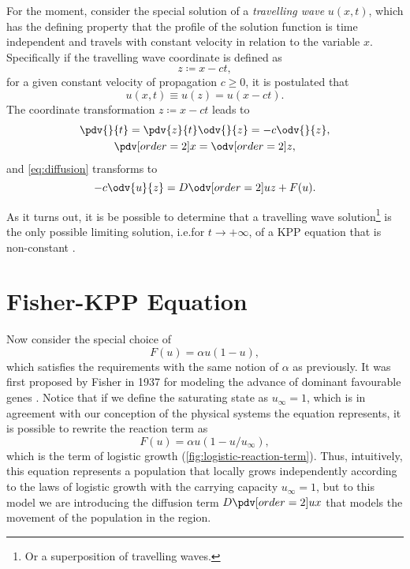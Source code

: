For the moment, consider the special solution of a \emph{travelling wave} \(u(x,t)\), which has the defining property that
    the profile of the solution function is time independent and travels with constant velocity in relation to the 
    variable \(x\).
Specifically if the travelling wave coordinate is defined as \[
    z \coloneqq x - ct,
    \] for a given constant velocity of propagation \(c \ge 0\), it is postulated that \[
        u(x,t) \equiv u(z) = u(x - ct).
    \]
The coordinate transformation \(z \coloneqq x - ct\) leads to \begin{equation}\label{eq:tw-transformation}
    \begin{gathered}
        \pdv{}{t} = \pdv{z}{t} \odv{}{z} = -c \odv{}{z},\\
        \pdv[order={2}]{}{x} = \odv[order={2}]{}{z},
    \end{gathered}
\end{equation}
and \cref{eq:diffusion} transforms to \begin{equation*}
    -c \odv{u}{z} = D\odv[order={2}]{u}{z} + F(u).
\end{equation*}

As it turns out, it is be possible to determine that a travelling wave solution\footnote{Or a superposition of travelling
    waves.} is the only possible limiting solution, i.e.\@ for \(t \to +\infty\), of a \ac{KPP} equation that is 
    non-constant \cite{kolmogorov1937a}. 


\section{Fisher-\ac{KPP} Equation}%
\label{sec:fisher-kpp-equation}

Now consider the special choice of \[
    F(u) = \alpha u (1 - u),
    \] which satisfies the requirements  with the same notion of \(\alpha\) as previously.
It was first proposed by Fisher in 1937 for modeling the advance of dominant favourable genes 
    \cite{wikipedia-KPP-Fisher}.
Notice that if we define the saturating state as \(u_{\infty} = 1\), which is in agreement with our conception of the
    physical systems the equation represents, it is possible to rewrite the reaction term as \begin{equation}
        \label{eq:fisher-reaction-term}
        F(u) = \alpha u (1 - u/u_{\infty}),
    \end{equation}
    which is the term of logistic growth (\cref{fig:logistic-reaction-term}).
Thus, intuitively, this equation represents a population that locally grows independently according to the laws of
    logistic growth with the carrying capacity \(u_\infty = 1\), but to this model we are introducing the diffusion term
    \(D\pdv[order={2}]{u}{x}\) that models the movement of the population in the region.

